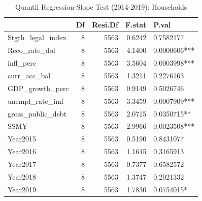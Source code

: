 \begin{table}[ht]
\centering
\caption{Quantil Regression-Slope Test (2014-2019): Households} 
\begingroup\small
\begin{tabular}{lrrrl}
  \toprule
 & Df & Resi.Df & F.stat & P.val \\ 
  \midrule
Stgth\_legal\_index & 8 & 5563 & 0.6242 & 0.7582177 \\ 
  Reco\_rate\_dol & 8 & 5563 & 4.1400 & 0.0000606*** \\ 
  infl\_perc & 8 & 5563 & 3.5604 & 0.0003998*** \\ 
  curr\_acc\_bal & 8 & 5563 & 1.3211 & 0.2276163 \\ 
  GDP\_growth\_perc & 8 & 5563 & 0.9149 & 0.5026746 \\ 
  unempl\_rate\_imf & 8 & 5563 & 3.3459 & 0.0007909*** \\ 
  gross\_public\_debt & 8 & 5563 & 2.0715 & 0.0350715** \\ 
  SSMY & 8 & 5563 & 2.9966 & 0.0023508*** \\ 
  Year2015 & 8 & 5563 & 0.5190 & 0.8431077 \\ 
  Year2016 & 8 & 5563 & 1.1645 & 0.3165913 \\ 
  Year2017 & 8 & 5563 & 0.7377 & 0.6582572 \\ 
  Year2018 & 8 & 5563 & 1.3747 & 0.2021332 \\ 
  Year2019 & 8 & 5563 & 1.7830 & 0.0754015* \\ 
   \bottomrule
\end{tabular}
\endgroup
\end{table}
